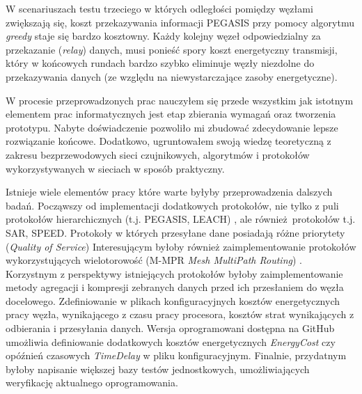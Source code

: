 \documentclass[a4paper,12pt,twoside,openany]{report}
\begin{document}
W scenariuszach testu trzeciego w których odległości pomiędzy węzłami zwiększają się, koszt przekazywania informacji PEGASIS przy pomocy algorytmu \textit{greedy} staje się bardzo kosztowny. 
Każdy kolejny węzeł odpowiedzialny za przekazanie (\textit{relay}) danych, musi ponieść spory koszt energetyczny transmisji, który w końcowych rundach bardzo szybko eliminuje węzły niezdolne do przekazywania danych
(ze względu na niewystarczające zasoby energetyczne).

W procesie przeprowadzonych prac nauczyłem się przede wszystkim jak istotnym elementem prac informatycznych jest etap zbierania wymagań oraz tworzenia prototypu.
Nabyte doświadczenie pozwoliło mi zbudować zdecydowanie lepsze rozwiązanie końcowe. 
Dodatkowo, ugruntowałem swoją wiedzę teoretyczną z zakresu bezprzewodowych sieci czujnikowych, algorytmów i protokołów wykorzystywanych w sieciach w sposób praktyczny.

Istnieje wiele elementów pracy które warte byłyby przeprowadzenia dalszych badań.
Począwszy od implementacji dodatkowych protokołów, nie tylko z puli protokołów hierarchicznych (t.j. PEGASIS, LEACH) \cite{teen-Manjeshwar}, ale również protokołów t.j. SAR, SPEED. Protokoły w których przesyłane dane posiadają różne priorytety (\textit{Quality of Service})
Interesującym byłoby również zaimplementowanie protokołów wykorzystujących wielotorowość (M-MPR \textit{Mesh MultiPath Routing}) \cite{Sohrab} \cite{Protocols-Sohrabi} \cite{Gao}.
Korzystnym z perspektywy istniejących protokołów byłoby zaimplementowanie metody agregacji i kompresji zebranych danych przed ich przesłaniem do węzła docelowego.
Zdefiniowanie w plikach konfiguracyjnych kosztów energetycznych pracy węzła, wynikającego z czasu pracy procesora, kosztów strat wynikających z odbierania i przesyłania danych.
Wersja oprogramowani dostępna na GitHub umożliwia definiowanie dodatkowych kosztów energetycznych \textit{EnergyCost} \cite{Slijepcevic} czy opóźnień czasowych \textit{TimeDelay} w pliku konfiguracyjnym.
Finalnie, przydatnym byłoby napisanie większej bazy testów jednostkowych, umożliwiających weryfikację aktualnego oprogramowania.


\end{document}
